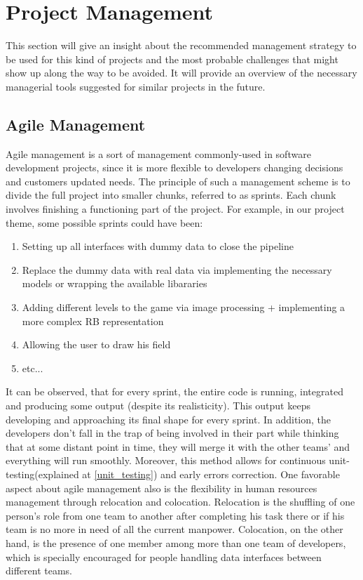 \section{Project Management}
This section will give an insight about the recommended management strategy to be used for this kind of projects and the most probable challenges that might show up along the way to be avoided. It will provide an overview of the necessary managerial tools suggested for similar projects in the future.


\subsection{Agile Management}
Agile management is a sort of management commonly-used in software development projects, since it is more flexible to developers changing decisions and customers updated needs. The principle of such a management scheme is to divide the full project into smaller chunks, referred to as sprints. Each chunk involves finishing a functioning part of the project. For example, in our project theme, some possible sprints could have been:
\begin{enumerate}
  \item{Setting up all interfaces with dummy data to close the pipeline}
  \item{Replace the dummy data with real data via implementing the necessary models or wrapping the available libararies}
  \item{Adding different levels to the game via image processing + implementing a more complex RB representation}
  \item{Allowing the user to draw his field}
  \item{etc...}
\end{enumerate}
It can be observed, that for every sprint, the entire code is running, integrated and producing some output (despite its realisticity). This output keeps developing and approaching its final shape for every sprint. In addition, the developers don't fall in the trap of being involved in their part while thinking that at some distant point in time, they will merge it with the other teams' and everything will run smoothly. Moreover, this method allows for continuous unit-testing(explained at \ref{unit_testing}) and early errors correction.
One favorable aspect about agile management also is the flexibility in human resources management through relocation and colocation. Relocation is the shuffling of one person's role from one team to another after completing his task there or if his team is no more in need of all the current manpower. Colocation, on the other hand, is the presence of one member among more than one team of developers, which is specially encouraged for people handling data interfaces between different teams.


